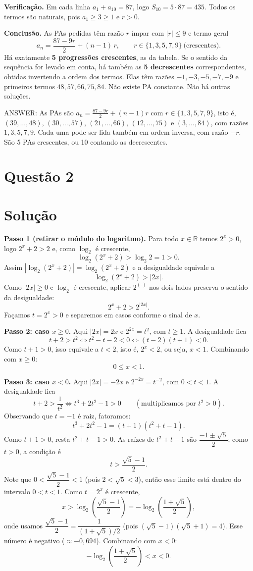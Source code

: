 \documentclass{article}%
\begin{document}
\textbf{Verificação.} Em cada linha $a_1+a_{10}=87$, logo $S_{10}=5\cdot 87=435$. Todos os termos são naturais, pois $a_1\ge 3\ge 1$ e $r>0$.

\textbf{Conclusão.} As PAs pedidas têm razão $r$ ímpar com $|r|\le 9$ e termo geral
\[
a_n=\frac{87-9r}{2}+(n-1)\,r,\qquad r\in\{1,3,5,7,9\}\ \text{(crescentes)}.
\]
Há exatamente \textbf{5 progressões crescentes}, as da tabela. Se o sentido da sequência for levado em conta, há também as \textbf{5 decrescentes} correspondentes, obtidas invertendo a ordem dos termos. Elas têm razões $-1,-3,-5,-7,-9$ e primeiros termos $48,57,66,75,84$. Não existe PA constante. Não há outras soluções.

ANSWER: As PAs são $a_n=\frac{87-9r}{2}+(n-1)r$ com $r\in\{1,3,5,7,9\}$, isto é, $(39,\dots,48)$, $(30,\dots,57)$, $(21,\dots,66)$, $(12,\dots,75)$ e $(3,\dots,84)$, com razões $1,3,5,7,9$. Cada uma pode ser lida também em ordem inversa, com razão $-r$. São 5 PAs crescentes, ou 10 contando as decrescentes.%
\newpage%
\section*{Questão 2}

\section*{Solução}

\textbf{Passo 1 (retirar o módulo do logaritmo).} Para todo $x\in\mathbb{R}$ temos $2^x>0$, logo $2^x+2>2$ e, como $\log_2$ é crescente,
\[
\log_2(2^x+2)>\log_2 2=1>0 .
\]
Assim $|\log_2(2^x+2)|=\log_2(2^x+2)$ e a desigualdade equivale a
\[
\log_2(2^x+2)>|2x| .
\]
Como $|2x|\ge 0$ e $\log_2$ é crescente, aplicar $2^{(\cdot)}$ nos dois lados preserva o sentido da desigualdade:
\[
2^x+2>2^{|2x|}.
\]
Façamos $t=2^x>0$ e separemos em casos conforme o sinal de $x$.

\textbf{Passo 2: caso $x\ge 0$.} Aqui $|2x|=2x$ e $2^{2x}=t^2$, com $t\ge 1$. A desigualdade fica
\[
t+2>t^2 \iff t^2-t-2<0 \iff (t-2)(t+1)<0 .
\]
Como $t+1>0$, isso equivale a $t<2$, isto é, $2^x<2$, ou seja, $x<1$. Combinando com $x\ge 0$:
\[
0\le x<1 .
\]

\textbf{Passo 3: caso $x<0$.} Aqui $|2x|=-2x$ e $2^{-2x}=t^{-2}$, com $0<t<1$. A desigualdade fica
\[
t+2>\frac1{t^2}\iff t^3+2t^2-1>0 \qquad (\text{multiplicamos por } t^2>0).
\]
Observando que $t=-1$ é raiz, fatoramos:
\[
t^3+2t^2-1=(t+1)(t^2+t-1).
\]
Como $t+1>0$, resta $t^2+t-1>0$. As raízes de $t^2+t-1$ são $\dfrac{-1\pm\sqrt5}{2}$; como $t>0$, a condição é
\[
t>\frac{\sqrt5-1}{2}.
\]
Note que $0<\dfrac{\sqrt5-1}{2}<1$ (pois $2<\sqrt5<3$), então esse limite está dentro do intervalo $0<t<1$. Como $t=2^x$ é crescente,
\[
x>\log_2\!\left(\frac{\sqrt5-1}{2}\right)=-\log_2\!\left(\frac{1+\sqrt5}{2}\right),
\]
onde usamos $\dfrac{\sqrt5-1}{2}=\dfrac{1}{(1+\sqrt5)/2}$ (pois $(\sqrt5-1)(\sqrt5+1)=4$). Esse número é negativo ($\approx -0{,}694$). Combinando com $x<0$:
\[
-\log_2\!\left(\frac{1+\sqrt5}{2}\right)<x<0 .
\]
\end{document}
